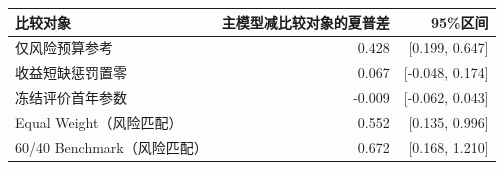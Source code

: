 \begin{tabular}{lrr}
\toprule
比较对象 & 主模型减比较对象的夏普差 & 95\%区间\\\midrule
仅风险预算参考 & 0.428 & [0.199, 0.647]\\
收益短缺惩罚置零 & 0.067 & [-0.048, 0.174]\\
冻结评价首年参数 & -0.009 & [-0.062, 0.043]\\
Equal Weight（风险匹配） & 0.552 & [0.135, 0.996]\\
60/40 Benchmark（风险匹配） & 0.672 & [0.168, 1.210]\\
\bottomrule
\end{tabular}